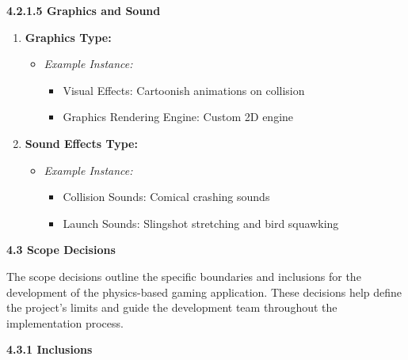 \documentclass[
]{article}
\begin{document}
\textbf{4.2.1.5 Graphics and Sound}

\begin{enumerate}
\def\labelenumi{\arabic{enumi}.}
\setcounter{enumi}{10}
\item
  \textbf{Graphics Type:}

  \begin{itemize}
  \item
    \emph{Example Instance:}

    \begin{itemize}
    \item
      Visual Effects: Cartoonish animations on collision
    \item
      Graphics Rendering Engine: Custom 2D engine
    \end{itemize}
  \end{itemize}
\item
  \textbf{Sound Effects Type:}

  \begin{itemize}
  \item
    \emph{Example Instance:}

    \begin{itemize}
    \item
      Collision Sounds: Comical crashing sounds
    \item
      Launch Sounds: Slingshot stretching and bird squawking
    \end{itemize}
  \end{itemize}
\end{enumerate}

\protect\hypertarget{qrrrrrrrr}{}{}\textbf{4.3 Scope Decisions}

The scope decisions outline the specific boundaries and inclusions for
the development of the physics-based gaming application. These decisions
help define the project's limits and guide the development team
throughout the implementation process.

\textbf{4.3.1 Inclusions}
\end{document}
